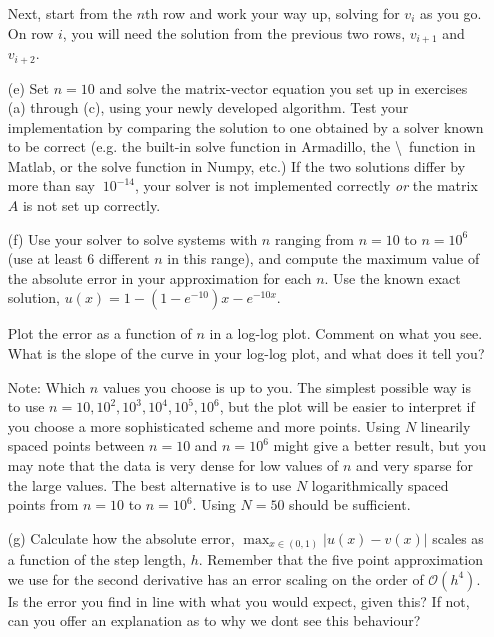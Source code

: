 \documentclass[11pt,a4wide]{article}
\begin{document}
\begin{itemize}
Next, start from the $n$th row and work your way up, solving for $v_i$ as you go. On row $i$, you will need the solution from the previous two rows, $v_{i+1}$ and $v_{i+2}$.
\item[(e)] Set $n=10$ and solve the matrix-vector equation you set up in exercises (a) through (c), using your newly developed algorithm.
  Test your implementation by comparing the solution to one obtained by a solver known to be correct (e.g. the built-in solve function in Armadillo, the \textbackslash \ function in Matlab, or the solve function in Numpy, etc.) If the two solutions differ by more than say $~10^{-14}$, your solver is not implemented correctly \emph{or} the matrix $A$ is not set up correctly.

  \item[(f)] Use your solver to solve systems with $n$ ranging from $n=10$ to $n=10^6$ (use at least $6$ different $n$ in this range), and compute the maximum value of the absolute error in your approximation for each $n$. Use the known exact solution, $u(x) = 1-(1-e^{-10})x-e^{-10x}$. 

  Plot the error as a function of $n$ in a log-log plot. Comment on what you see. What is the slope of the curve in your log-log plot, and what does it tell you? 

  Note: Which $n$ values you choose is up to you. The simplest possible way is to use $n=10,10^2,10^3,10^4,10^5,10^6$, but the plot will be easier to interpret if you choose a more sophisticated scheme and more points. Using $N$ linearily spaced points between $n=10$ and $n=10^6$ might give a better result, but you may note that the data is very dense for low values of $n$ and very sparse for the large values. The best alternative is to use $N$ logarithmically spaced points from $n=10$ to $n=10^6$. Using $N=50$ should be sufficient.
\item[(g)] Calculate how the absolute error, $\max_{x\in(0,1)}|u(x)-v(x)|$ scales as a function of the step length, $h$. Remember that the five point approximation we use for the second derivative has an error scaling on the order of $\mathcal{O}(h^4)$. Is the error you find in line with what you would expect, given this? If not, can you offer an explanation as to why we dont see this behaviour?
\end{itemize}
\end{document}
